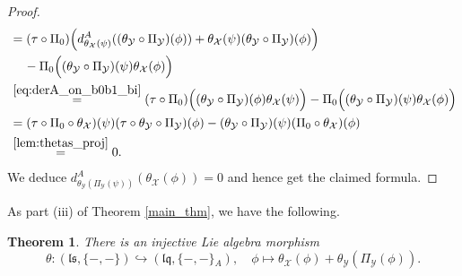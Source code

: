 \documentclass[12pt,reqno]{amsart}
\newtheorem{thm}{Theorem}[section]
\numberwithin{equation}{section}
\theoremstyle{definition}
\newcommand{\X}{\mathcal{X}}
\newcommand{\Y}{\mathcal{Y}}
\newcommand{\ls}{\mathfrak{ls}}
\newcommand{\lqq}{\mathfrak{lq}}
\newcommand{\ariemp}{\{-,-\}\!_A}
\newcommand{\der}[1]{d_{#1}^A}
\newcommand{\pizero}{\Pi_0}
\newcommand{\piY}{\Pi_\Y}
\newcommand{\thetaX}{\theta_\X}
\newcommand{\thetaY}{\theta_\Y}
\begin{document}
\begin{proof}
\begin{align*}
&=(\tau\circ\pizero)\Big(\der{\thetaX(\psi)}((\thetaY\circ\piY)(\phi))+\thetaX(\psi)(\thetaY\circ\piY)(\phi)\Big)\\
&\hspace{0.4cm}-\pizero\Big((\thetaY\circ\piY)(\psi)\thetaX(\phi)\Big) \\
&\overset{\ref{eq:derA_on_b0b1_bi}}{=} (\tau\circ \pizero)\Big((\thetaY\circ\piY)(\phi)\thetaX(\psi)\Big)-\pizero\Big((\thetaY\circ\piY)(\psi)\thetaX(\phi)\Big) \\
&=(\tau\circ\pizero\circ\thetaX)(\psi)(\tau\circ\thetaY\circ\piY)(\phi)-(\thetaY\circ\piY)(\psi)(\pizero\circ \thetaX)(\phi) \\
&\overset{\ref{lem:thetas_proj}}{=}0.
\end{align*}
We deduce $\der{\thetaY(\piY(\psi))}(\thetaX(\phi))=0$ and hence get the claimed formula.
\end{proof}

As part (iii) of Theorem \ref{main_thm}, we have the following.

\begin{thm} \label{thm:emb_ls_lq} There is an injective Lie algebra morphism
\[\theta:(\ls,\{-,-\})\hookrightarrow (\lqq,\ariemp), \quad \phi\mapsto \thetaX(\phi)+\thetaY(\piY(\phi)).\]
\end{thm}
\end{document}
